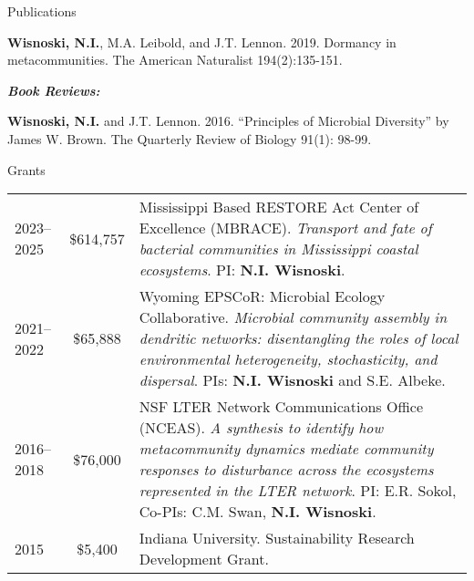 \documentclass{resume} %
\begin{document}
\begin{rSection}{Publications}
\begin{etaremune}
\item {\bf Wisnoski, N.I.}, M.A. Leibold, and J.T. Lennon. 2019. Dormancy in metacommunities. The American Naturalist 194(2):135-151.

\end{etaremune}

\smallskip

{\bf\em Book Reviews:}
\begin{etaremune}
\item {\bf Wisnoski, N.I.} and J.T. Lennon. 2016. \enquote{Principles of Microbial Diversity} by James W. Brown. The Quarterly Review of Biology 91(1): 98-99.

\end{etaremune}
\end{rSection}

\bigskip

\begin{rSection}{Grants}
\begin{xltabular}{\textwidth}{lc>{\raggedright\arraybackslash}X}
2023--2025 & \$614,757 & Mississippi Based RESTORE Act Center of Excellence (MBRACE). \textit{Transport and fate of bacterial communities in Mississippi coastal ecosystems}. PI: {\bf N.I. Wisnoski}. \\

2021--2022 & \$65,888 & Wyoming EPSCoR: Microbial Ecology Collaborative. \textit{Microbial community assembly in dendritic networks: disentangling the roles of local environmental heterogeneity, stochasticity, and dispersal}. PIs: {\bf N.I. Wisnoski} and S.E. Albeke.\\

2016--2018 & \$76,000 & NSF LTER Network Communications Office (NCEAS). \textit{A synthesis to identify how metacommunity dynamics mediate community responses to disturbance across the ecosystems represented in the LTER network}. PI: E.R. Sokol, Co-PIs: C.M. Swan, {\bf N.I. Wisnoski}.\\

2015 & \$5,400 & Indiana University. Sustainability Research Development Grant.
\end{xltabular}
\end{rSection}
\end{document}
